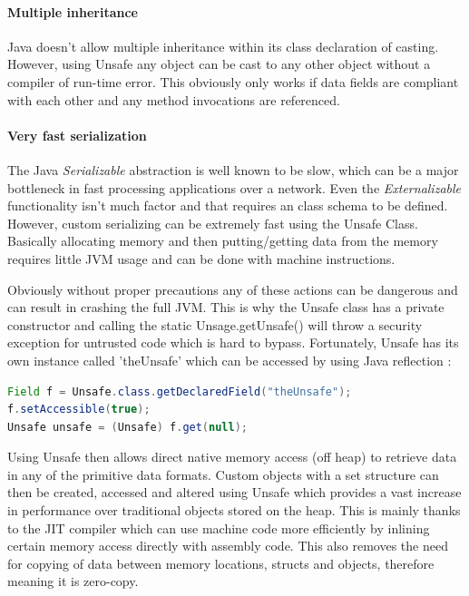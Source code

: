 \documentclass[final_report.tex]{subfiles}
\begin{document}
\paragraph*{Multiple inheritance}
Java doesn't allow multiple inheritance within its class declaration of casting. However, using Unsafe any object can be cast to any other object without a compiler of run-time error. This obviously only works if data fields are compliant with each other and any method invocations are referenced. 

\paragraph*{Very fast serialization}
The Java \textit{Serializable} abstraction is well known to be slow, which can be a major bottleneck in fast processing applications over a network. Even the \textit{Externalizable} functionality isn't much factor and that requires an class schema to be defined. However, custom serializing can be extremely fast using the Unsafe Class. Basically allocating memory and then putting/getting data from the memory requires little JVM usage and can be done with machine instructions.

Obviously without proper precautions any of these actions can be dangerous and can result in crashing the full JVM. This is why the Unsafe class has a private constructor and calling the static Unsage.getUnsafe() will throw a security exception for untrusted code which is hard to bypass. Fortunately, Unsafe has its own instance called 'theUnsafe' which can be accessed by using Java reflection :

\begin{lstlisting}[language=Java, caption={Accessing Java Unsafe}, label=lst:java_unsafe]
Field f = Unsafe.class.getDeclaredField("theUnsafe");
f.setAccessible(true);
Unsafe unsafe = (Unsafe) f.get(null);
\end{lstlisting}

Using Unsafe then allows direct native memory access (off heap) to retrieve data in any of the primitive data formats. Custom objects with a set structure can then be created, accessed and altered using Unsafe which provides a vast increase in performance over traditional objects stored on the heap. This is mainly thanks to the JIT compiler which can use machine code more efficiently by inlining certain memory access directly with assembly code. This also removes the need for copying of data between memory locations, structs and objects, therefore meaning it is zero-copy.
\end{document}

